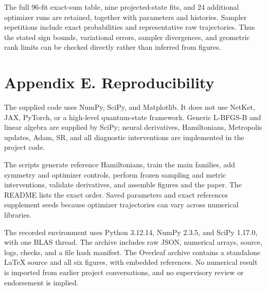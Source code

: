 \documentclass[
  11pt,
  a4paper,
]{article}
\begin{document}
The full 96-fit exact-sum table, nine projected-state fits, and 24
additional optimizer runs are retained, together with parameters and
histories. Sampler repetitions include exact probabilities and
representative raw trajectories. Thus the stated sign bounds,
variational errors, sampler divergences, and geometric rank limits can
be checked directly rather than inferred from figures.

\hypertarget{appendix-e.-reproducibility}{%
\section{Appendix E.
Reproducibility}\label{appendix-e.-reproducibility}}

The supplied code uses NumPy, SciPy, and Matplotlib. It does not use
NetKet, JAX, PyTorch, or a high-level quantum-state framework. Generic
L-BFGS-B and linear algebra are supplied by SciPy; neural derivatives,
Hamiltonians, Metropolis updates, Adam, SR, and all diagnostic
interventions are implemented in the project code.

The scripts generate reference Hamiltonians, train the main families,
add symmetry and optimizer controls, perform frozen sampling and metric
interventions, validate derivatives, and assemble figures and the paper.
The README lists the exact order. Saved parameters and exact references
supplement seeds because optimizer trajectories can vary across
numerical libraries.

The recorded environment uses Python 3.12.14, NumPy 2.3.5, and SciPy
1.17.0, with one BLAS thread. The archive includes raw JSON, numerical
arrays, source, logs, checks, and a file hash manifest. The Overleaf
archive contains a standalone LaTeX source and all six figures, with
embedded references. No numerical result is imported from earlier
project conversations, and no supervisory review or endorsement is
implied.
\end{document}
